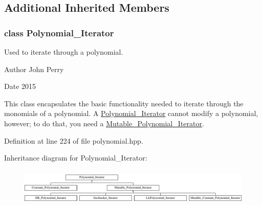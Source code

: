 \subsection*{Additional Inherited Members}
\label{class_polynomial___iterator}
\subsubsection{class Polynomial\+\_\+\+Iterator}
Used to iterate through a polynomial. 

\begin{DoxyAuthor}{Author}
John Perry 
\end{DoxyAuthor}
\begin{DoxyDate}{Date}
2015
\end{DoxyDate}
This class encapsulates the basic functionality needed to iterate through the monomials of a polynomial. A \hyperlink{group___iterator_group_class_polynomial___iterator}{Polynomial\+\_\+\+Iterator} cannot modify a polynomial, however; to do that, you need a \hyperlink{group___iterator_group_class_mutable___polynomial___iterator}{Mutable\+\_\+\+Polynomial\+\_\+\+Iterator}. 

Definition at line 224 of file polynomial.\+hpp.

Inheritance diagram for Polynomial\+\_\+\+Iterator\+:\begin{figure}[H]
\begin{center}
\leavevmode
\includegraphics[height=1.779661cm]{group___iterator_group}
\end{center}
\end{figure}
